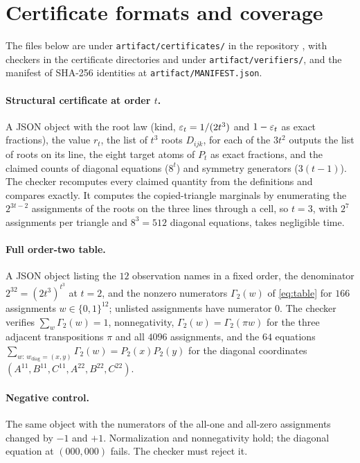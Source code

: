 \section{Certificate formats and coverage}\label{app:certificates}

The files below are under \texttt{artifact/certificates/} in the repository \repo, with checkers in the certificate directories and under \texttt{artifact/verifiers/}, and the manifest of SHA-256 identities at \texttt{artifact/MANIFEST.json}.

\paragraph{Structural certificate at order $t$.}
A JSON object with the root law (kind, $\varepsilon_t=1/(2t^3)$ and $1-\varepsilon_t$ as exact fractions), the value $r_t$, the list of $t^3$ roots $D_{ijk}$, for each of the $3t^2$ outputs the list of roots on its line, the eight target atoms of $P_t$ as exact fractions, and the claimed counts of diagonal equations ($8^t$) and symmetry generators ($3(t-1)$). The checker recomputes every claimed quantity from the definitions and compares exactly. It computes the copied-triangle marginals by enumerating the $2^{3t-2}$ assignments of the roots on the three lines through a cell, so $t=3$, with $2^7$ assignments per triangle and $8^3=512$ diagonal equations, takes negligible time.

\paragraph{Full order-two table.}
A JSON object listing the $12$ observation names in a fixed order, the denominator $2^{32}=(2t^3)^{t^3}$ at $t=2$, and the nonzero numerators $\Gamma_2(w)$ of \eqref{eq:table} for $166$ assignments $w\in\{0,1\}^{12}$; unlisted assignments have numerator $0$. The checker verifies $\sum_w\Gamma_2(w)=1$, nonnegativity, $\Gamma_2(w)=\Gamma_2(\pi w)$ for the three adjacent transpositions $\pi$ and all $4096$ assignments, and the $64$ equations $\sum_{w:\,w_{\mathrm{diag}}=(x,y)}\Gamma_2(w)=P_2(x)P_2(y)$ for the diagonal coordinates $(A^{11},B^{11},C^{11},A^{22},B^{22},C^{22})$.

\paragraph{Negative control.}
The same object with the numerators of the all-one and all-zero assignments changed by $-1$ and $+1$. Normalization and nonnegativity hold; the diagonal equation at $(000,000)$ fails. The checker must reject it.

